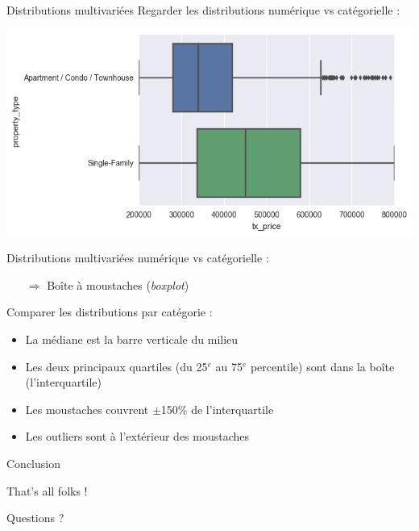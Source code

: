 \documentclass[french]{beamer}
\begin{document}
\begin{frame}{Distributions multivariées}
Regarder les distributions numérique vs catégorielle : 
\begin{center}
	\includegraphics[height=0.8\textheight]{boxplot}
\end{center}
\end{frame}

\begin{frame}{Distributions multivariées}
numérique vs catégorielle : 
\begin{itemize}
	\item[$\Rightarrow$] Boîte à moustaches (\emph{boxplot})
\end{itemize}

Comparer les distributions par catégorie : 
\begin{itemize}
	\item La médiane est la barre verticale du milieu
	\item Les deux principaux quartiles (du 25$^e$ au 75$^e$ percentile) sont dans la boîte (l'interquartile)
	\item Les moustaches couvrent $\pm$150\% de l'interquartile
	\item Les outliers sont à l'extérieur des moustaches
\end{itemize}
\end{frame}

 \begin{frame}[label=conclu]{Conclusion}
\begin{center}
	\Huge{That's all folks !}
	
	\normalsize Questions ?
\end{center}
\end{frame}


\end{document}
